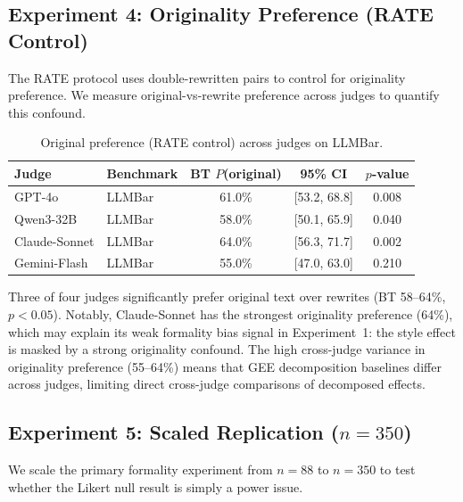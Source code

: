 \documentclass[11pt,a4paper]{article}
\begin{document}
\subsection{Experiment 4: Originality Preference (RATE Control)}
\label{sec:rate-control}

The RATE protocol \citep{rate2025} uses double-rewritten pairs to control for originality preference. We measure original-vs-rewrite preference across judges to quantify this confound.

\begin{table}[h]
\centering
\caption{Original preference (RATE control) across judges on LLMBar.}
\label{tab:rate-control}
\begin{tabular}{llccc}
\toprule
\textbf{Judge} & \textbf{Benchmark} & \textbf{BT $P$(original)} & \textbf{95\% CI} & \textbf{$p$-value} \\
\midrule
GPT-4o & LLMBar & 61.0\% & [53.2, 68.8] & 0.008 \\
Qwen3-32B & LLMBar & 58.0\% & [50.1, 65.9] & 0.040 \\
Claude-Sonnet & LLMBar & 64.0\% & [56.3, 71.7] & 0.002 \\
Gemini-Flash & LLMBar & 55.0\% & [47.0, 63.0] & 0.210 \\
\bottomrule
\end{tabular}
\end{table}

Three of four judges significantly prefer original text over rewrites (BT 58--64\%, $p<0.05$). Notably, Claude-Sonnet has the strongest originality preference (64\%), which may explain its weak formality bias signal in Experiment~1: the style effect is masked by a strong originality confound. The high cross-judge variance in originality preference (55--64\%) means that GEE decomposition baselines differ across judges, limiting direct cross-judge comparisons of decomposed effects.

\subsection{Experiment 5: Scaled Replication ($n{=}350$)}
\label{sec:scaled}

We scale the primary formality experiment from $n{=}88$ to $n{=}350$ to test whether the Likert null result is simply a power issue.
\end{document}
